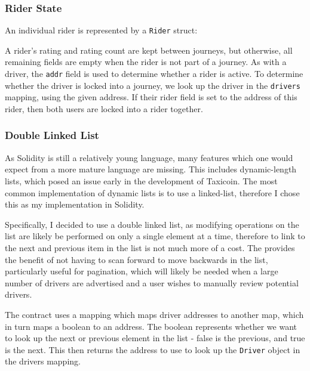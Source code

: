 \subsubsection{Rider State}

An individual rider is represented by a \lstinline{Rider} struct:



A rider's rating and rating count are kept between journeys, but otherwise, all remaining fields are empty when the rider is not part of a journey. As with a driver, the \lstinline{addr} field is used to determine whether a rider is active. To determine whether the driver is locked into a journey, we look up the driver in the \lstinline{drivers} mapping, using the given address. If their rider field is set to the address of this rider, then both users are locked into a rider together.

\subsubsection{Double Linked List}

As Solidity is still a relatively young language, many features which one would expect from a more mature language are missing. This includes dynamic-length lists, which posed an issue early in the development of Taxicoin. The most common implementation of dynamic lists is to use a linked-list, therefore I chose this as my implementation in Solidity\footnotemark.

Specifically, I decided to use a double linked list, as modifying operations on the list are likely be performed on only a single element at a time, therefore to link to the next and previous item in the list is not much more of a cost. The provides the benefit of not having to scan forward to move backwards in the list, particularly useful for pagination, which will likely be needed when a large number of drivers are advertised and a user wishes to manually review potential drivers.

The contract uses a mapping which maps driver addresses to another map, which in turn maps a boolean to an address. The boolean represents whether we want to look up the next or previous element in the list - false is the previous, and true is the next. This then returns the address to use to look up the \lstinline{Driver} object in the drivers mapping.


